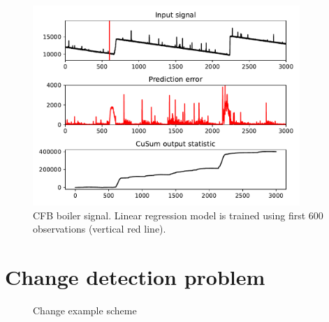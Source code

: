 \begin{figure}[!htb]
	\centering
	\includegraphics[width=0.9\textwidth]{images/boiler_fixed_train}
	\caption{CFB boiler signal.
Linear regression model is trained using first 600 observations (vertical red line).	
}\label{fig:boiler_fixed_train}
\end{figure}

\section{Change detection problem}

\begin{figure}[!htb]
	\centering
	
	\caption{Change example scheme}\label{fig:change_example}
\end{figure}

